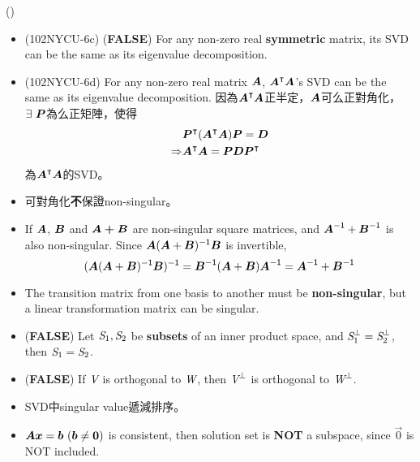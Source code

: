 \item \begin{theorem}{()} \quad\quad \begin{itemize}
        \item (102NYCU-6c) (\textbf{FALSE}) For any non-zero real \textbf{symmetric} matrix, its SVD can be the same as its eigenvalue decomposition.
        \item (102NYCU-6d) For any non-zero real matrix $\boldsymbol{A}$, $\boldsymbol{A}^\intercal\boldsymbol{A}$'s SVD can be the same as its eigenvalue decomposition. 
        因為$\boldsymbol{A}^\intercal\boldsymbol{A}$正半定，$\boldsymbol{A}$可么正對角化，$\exists \ \boldsymbol{P}$為么正矩陣，使得 \begin{equation}
            \begin{aligned}
                & \boldsymbol{P}^\intercal(\boldsymbol{A}^\intercal\boldsymbol{A})\boldsymbol{P} = \boldsymbol{D} \\
                \Rightarrow & \boldsymbol{A}^\intercal\boldsymbol{A} = \boldsymbol{P}\boldsymbol{D}\boldsymbol{P}^\intercal
            \end{aligned} 
        \end{equation} 為$\boldsymbol{A}^\intercal\boldsymbol{A}$的SVD。
        \item 可對角化\textbf{不}保證non-singular。
        \item If $\boldsymbol{A}$, $\boldsymbol{B}$ and $\boldsymbol{A + B}$ are non-singular square matrices, and $\boldsymbol{A}^{\mathsf{-1}} + \boldsymbol{B}^{\mathsf{-1}}$ is also non-singular.
        Since $\boldsymbol{A}(\boldsymbol{A} + \boldsymbol{B})^{\mathsf{-1}}\boldsymbol{B}$ is invertible, \begin{equation}
            (\boldsymbol{A}(\boldsymbol{A} + \boldsymbol{B})^{\mathsf{-1}}\boldsymbol{B})^{\mathsf{-1}} = \boldsymbol{B}^{\mathsf{-1}}(\boldsymbol{A} + \boldsymbol{B})\boldsymbol{A}^{\mathsf{-1}} = \boldsymbol{A}^{\mathsf{-1}} + \boldsymbol{B}^{\mathsf{-1}}
        \end{equation}
        \item The transition matrix from one basis to another must be \textbf{non-singular}, but a linear transformation matrix can be singular.
        \item (\textbf{FALSE}) Let $\textit{S}_1, \textit{S}_2$ be \textbf{subsets} of an inner product space, and $\textit{S}_1^{\bot} = \textit{S}_2^{\bot}$, then $\textit{S}_1 = \textit{S}_2$.
        \item (\textbf{FALSE}) If $\textit{V}$ is orthogonal to $\textit{W}$, then $\textit{V}^\bot$ is orthogonal to $\textit{W}^\bot$.
        \item SVD中singular value遞減排序。
        \item $\boldsymbol{A}\boldsymbol{x} = \boldsymbol{b} \ (\boldsymbol{b} \neq \boldsymbol{0})$ is consistent, then solution set is \textbf{NOT} a subspace, since $\vec{0}$ is NOT included.

\end{itemize}
\end{theorem}
